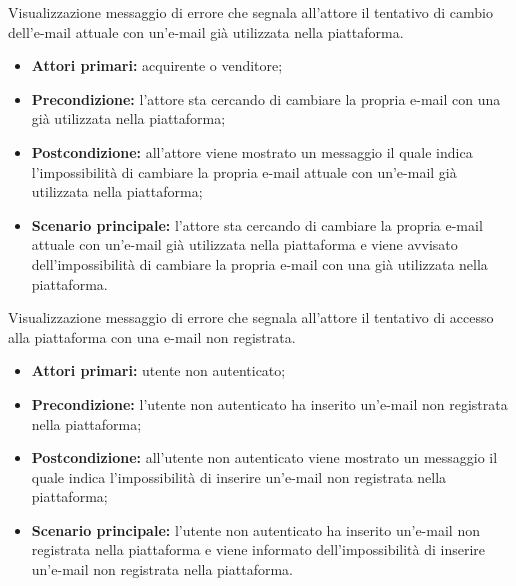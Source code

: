 Visualizzazione messaggio di errore che segnala all'attore il tentativo di cambio dell'e-mail attuale con un'e-mail già utilizzata nella piattaforma.
\begin{itemize}
    \item \textbf{Attori primari:} acquirente o venditore;
    \item \textbf{Precondizione:} l'attore sta cercando di cambiare la propria e-mail con una già utilizzata nella piattaforma;
    \item \textbf{Postcondizione:} all'attore viene mostrato un messaggio il quale indica l'impossibilità di cambiare la propria e-mail attuale con un'e-mail già utilizzata nella piattaforma;
    \item \textbf{Scenario principale:} l'attore sta cercando di cambiare la propria e-mail attuale con un'e-mail già utilizzata nella piattaforma e viene avvisato dell'impossibilità di cambiare la propria e-mail con una già utilizzata nella piattaforma.
\end{itemize}


Visualizzazione messaggio di errore che segnala all'attore il tentativo di accesso alla piattaforma con una e-mail non registrata.
\begin{itemize}
    \item \textbf{Attori primari:} utente non autenticato;
    \item \textbf{Precondizione:} l'utente non autenticato ha inserito un'e-mail non registrata nella piattaforma;
    \item \textbf{Postcondizione:} all'utente non autenticato viene mostrato un messaggio il quale indica l'impossibilità di inserire un'e-mail non registrata nella piattaforma;
    \item \textbf{Scenario principale:} l'utente non autenticato ha inserito un'e-mail non registrata nella piattaforma e viene informato dell'impossibilità di inserire un'e-mail non registrata nella piattaforma.
\end{itemize}


